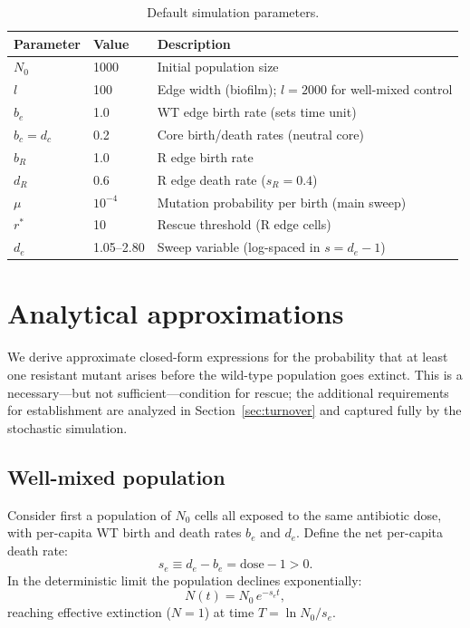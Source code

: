 \documentclass[12pt]{article}
\newcommand{\Nzero}{N_0}
\newcommand{\sEdge}{s_e}
\newcommand{\bEdge}{b_e}
\newcommand{\dEdge}{d_e}
\newcommand{\bCore}{b_c}
\newcommand{\dCore}{d_c}
\begin{document}
\begin{table}[h]
\centering
\caption{Default simulation parameters.}
\label{tab:params}
\begin{tabular}{lll}
\toprule
Parameter & Value & Description \\
\midrule
$N_0$        & 1000 & Initial population size \\
$l$          & 100  & Edge width (biofilm); $l = 2000$ for well-mixed control \\
$\bEdge$     & 1.0  & WT edge birth rate (sets time unit) \\
$\bCore = \dCore$ & 0.2 & Core birth/death rates (neutral core) \\
$b_R$        & 1.0  & R edge birth rate \\
$d_R$        & 0.6  & R edge death rate ($s_R = 0.4$) \\
$\mu$        & $10^{-4}$ & Mutation probability per birth (main sweep) \\
$r^*$        & 10   & Rescue threshold (R edge cells) \\
\midrule
$\dEdge$     & 1.05--2.80 & Sweep variable (log-spaced in $s = \dEdge - 1$) \\
\bottomrule
\end{tabular}
\end{table}

\section{Analytical approximations}
\label{sec:analytics}

We derive approximate closed-form expressions for the probability that at
least one resistant mutant arises before the wild-type population goes extinct.
This is a necessary---but not sufficient---condition for rescue; the
additional requirements for establishment are analyzed in
Section~\ref{sec:turnover} and captured fully by the stochastic simulation.

\subsection{Well-mixed population}
\label{sec:wm_approx}

Consider first a population of $\Nzero$ cells all exposed to the same
antibiotic dose, with per-capita WT birth and death rates $\bEdge$ and
$\dEdge$. Define the net per-capita death rate:
\begin{equation}
    \sEdge \equiv \dEdge - \bEdge = \text{dose} - 1 > 0.
\end{equation}
In the deterministic limit the population declines exponentially:
\begin{equation}
    N(t) = \Nzero\, e^{-\sEdge t},
    \label{eq:wm_traj}
\end{equation}
reaching effective extinction ($N = 1$) at time $T = \ln \Nzero / \sEdge$.
\end{document}
